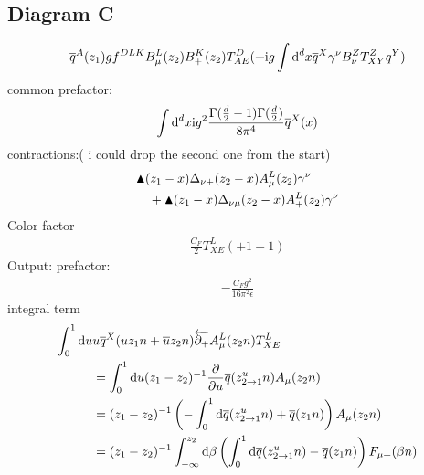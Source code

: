 \subsection{Diagram C}
\begin{align}
\overline q^A(z_1) g f^{DLK} B_\mu^L(z_2)B_+^K(z_2) T^D_{AE}   (+\text{i} g \int \text{d} ^d x \overline q^X \gamma^\nu B_\nu^Z T^Z_{XY} q^Y)
\end{align}
common prefactor:
\begin{align}
\int \text{d} ^d x \text{i} g^2  \frac{\Gamma(\frac{d}{2}-1)\Gamma(\frac{d}{2})}{8\pi^4}\overline q^X(x)
\end{align}
contractions:( i could drop the second one from the start)
\begin{align}
&\blacktriangle(z_1-x)\Delta_{\nu +}(z_2-x)A_\mu^L(z_2)\gamma^\nu
\\&~~~ 
+\blacktriangle(z_1-x)\Delta_{\nu \mu}(z_2-x)A_+^L(z_2)\gamma^\nu
\end{align}
Color factor
\begin{align}
\frac{C_F}{2} T^{L}_{XE}(+1-1)
\end{align}
Output:
prefactor:
\begin{align}
-\frac{ C_F g^2}{16 \pi^2 \epsilon}
\end{align}
integral term
\begin{align}
\int_0^1 \text{d} u& u \overline q^X(uz_1n+\overline u z_2n) \overleftarrow{\partial_+} A_\mu ^L(z_2 n)T^L_{XE}
\\
&=\int _0^1 \text{d} u (z_1-z_2)^{-1}\frac{\partial}{\partial u }\overline q(z_{2\rightarrow1}^un)A_\mu(z_2n)
\\
&=
(z_1-z_2)^{-1}\left(-\int _0^1 \text{d} \overline q(z_{2\rightarrow1}^un) +\overline q(z_1n)\right)A_\mu(z_2n)
\\
&=
(z_1-z_2)^{-1}\int _{-\infty}^{z_2} \text{d} \beta \left(\int _0^1 \text{d} \overline q(z_{2\rightarrow1}^un) -\overline q(z_1n)\right)F_{\mu+}(\beta n)
\end{align}


